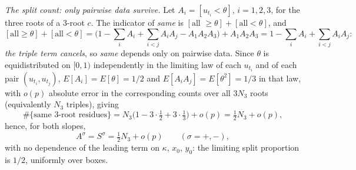 \smallskip\noindent\emph{The split count: only pairwise data survive.} Let $A_i=[u_{t_i}<\theta]$, $i=1,2,3$, for the
three roots of a $3$-root $c$. The indicator of \emph{same} is $[\text{all }\ge\theta]+[\text{all}<\theta]$, and
\[
[\text{all}\ge\theta]+[\text{all}<\theta]=\bigl(1-\textstyle\sum_iA_i+\sum_{i<j}A_iA_j-A_1A_2A_3\bigr)+A_1A_2A_3
=1-\sum_iA_i+\sum_{i<j}A_iA_j:
\]
\emph{the triple term cancels}, so \emph{same} depends only on pairwise data. Since $\theta$ is equidistributed on
$[0,1)$ independently in the limiting law of each $u_{t_i}$ and of each pair $(u_{t_i},u_{t_j})$, $E[A_i]=E[\theta]=1/2$
and $E[A_iA_j]=E[\theta^2]=1/3$ in that law, with $o(p)$ absolute error in the corresponding counts over
all $3N_3$ roots (equivalently $N_3$ triples), giving
\[
\#\{\text{same }3\text{-root residues}\}=N_3\bigl(1-3\cdot\tfrac12+3\cdot\tfrac13\bigr)+o(p)=\tfrac12N_3+o(p),
\]
hence, for both slopes,
\begin{equation}\label{eq:AS}
A^\sigma=S^\sigma=\tfrac12N_3+o(p)\qquad(\sigma=+,-),
\end{equation}
with no dependence of the leading term on $\kappa$, $x_0$, $y_0$: the limiting split proportion is $1/2$, uniformly over boxes.

